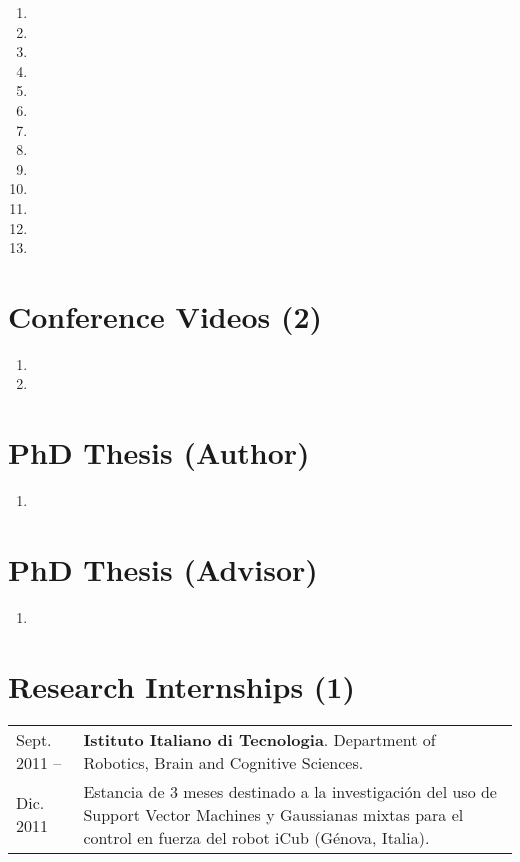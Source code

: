 \documentclass{article}
\begin{document}
\begin{enumerate}
  \item {}
  \item {}
  \item {}
  \item {}
  \item {}
  \item {}
  \item {}
  \item {}
  \item {}
  \item {}
  \item {}
  \item {}
  \item {}
\end{enumerate}

\section*{Conference Videos (2)}
\begin{enumerate}
  \item {}
  \item {}
\end{enumerate}

\section*{PhD Thesis (Author)}
\begin{enumerate}
  \item {}
\end{enumerate}

\section*{PhD Thesis (Advisor)}
\begin{enumerate}
  \item {}
\end{enumerate}

\section*{Research Internships (1)}
\begin{tabular}{l p{14cm}}
Sept. 2011 --&{\bf Istituto Italiano di Tecnologia}. Department of Robotics, Brain and Cognitive Sciences.\\
Dic. 2011&Estancia de 3 meses destinado a la investigación del uso de Support Vector Machines y Gaussianas mixtas para el control en fuerza del robot iCub (Génova, Italia).
\end{tabular}
\end{document}
